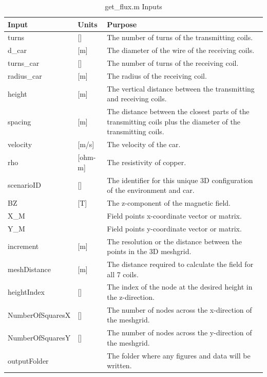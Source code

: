 \begin{table}[H]
    \caption[get\_flux.m Inputs]{get\_flux.m Inputs}
    \begin{center}
    \begin{tabular}{| p{} | p{} | p{} |}
    \hline
    Input & Units & Purpose \\
    \hline \hline
    turns & [] & The number of turns of the transmitting coils. \\
    d\_car & [m] & The diameter of the wire of the receiving coils. \\
    turns\_car & [] & The number of turns of the receiving coil. \\
    radius\_car & [m] & The radius of the receiving coil. \\
    height & [m] & The vertical distance between the transmitting and receiving coils. \\
    spacing & [m] & The distance between the closest parts of the transmitting coils plus the diameter of the transmitting coils. \\
    velocity & [m/s] & The velocity of the car. \\
    rho & [ohm-m] & The resistivity of copper. \\
    scenarioID & [] & The identifier for this unique 3D configuration of the environment and car. \\
    BZ & [T] & The z-component of the magnetic field. \\
    X\_M	& & Field points x-coordinate vector or matrix. \\
    Y\_M	 & & Field points y-coordinate vector or matrix. \\
    increment & [m] & The resolution or the distance between the points in the 3D meshgrid. \\
    meshDistance & [m] & The distance required to calculate the field for all 7 coils. \\
    heightIndex & [] & The index of the node at the desired height in the z-direction. \\
    NumberOfSquaresX & [] & The number of nodes across the x-direction of the meshgrid. \\
    NumberOfSquaresY & [] & The number of nodes across the y-direction of the meshgrid. \\
    outputFolder & & The folder where any figures and data will be written. \\
    \hline
    \end{tabular}
    \end{center}
    \label{t8}
\end{table}

